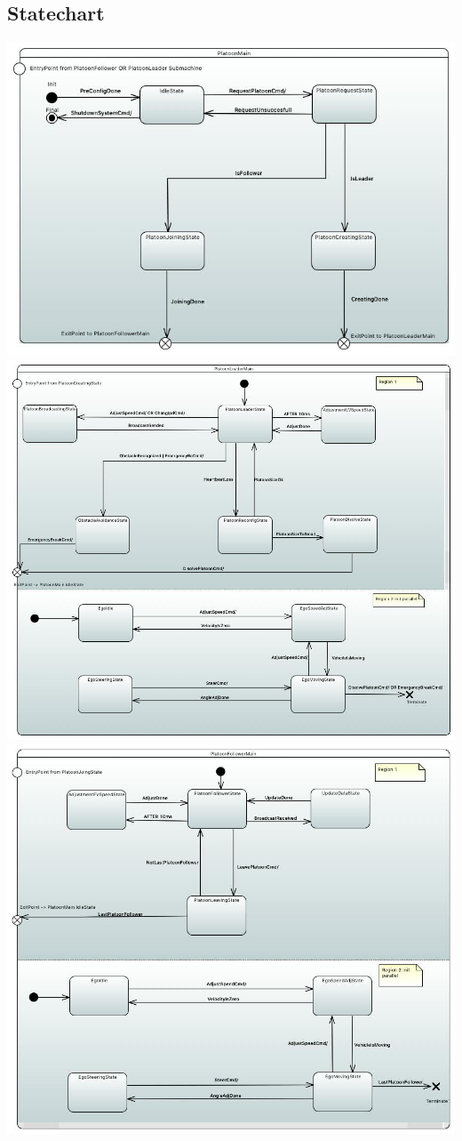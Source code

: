 \documentclass[a4paper, 12pt, titlepage]{scrartcl}
\begin{document}
{\begin{appendices}
\section{Statechart}
\includegraphics[width=\textwidth]{sm_PlatoonMain.jpg}
\newpage
\includegraphics[width=\textwidth]{sm_LeaderVehicle.jpg}
\newpage
\includegraphics[width=\textwidth]{sm_FollowerVehicle.jpg}

\end{appendices}}
\end{document}
